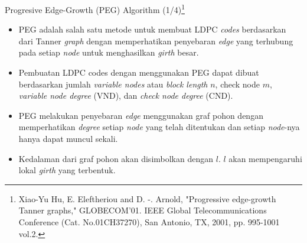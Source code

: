 \documentclass[11pt, aspectratio=169]{beamer}
\begin{document}
\begin{frame}{Progresive Edge-Growth (PEG) Algorithm (1/4)\footnote[1]{\tiny Xiao-Yu Hu, E. Eleftheriou and D. -. Arnold, "Progressive edge-growth Tanner graphs," GLOBECOM'01. IEEE Global Telecommunications Conference (Cat. No.01CH37270), San Antonio, TX, 2001, pp. 995-1001 vol.2.}}
\begin{itemize}
	\item PEG adalah salah satu metode untuk membuat LDPC \textit{codes} berdasarkan dari Tanner \textit{graph} dengan memperhatikan penyebaran \textit{edge} yang terhubung pada setiap \textit{node} untuk menghasilkan \textit{girth} besar.
	\item Pembuatan LDPC codes dengan menggunakan PEG dapat dibuat berdasarkan jumlah \textit{variable nodes} atau \textit{block length} $n$, check node $m$, \textit{variable node degree} (VND), dan \textit{check node degree} (CND).
	\item PEG melakukan penyebaran \textit{edge} menggunakan graf pohon dengan memperhatikan \textit{degree} setiap \textit{node} yang telah ditentukan dan setiap \textit{node}-nya hanya dapat muncul sekali.
	\item Kedalaman dari graf pohon akan disimbolkan dengan $l$. $l$ akan mempengaruhi lokal \textit{girth} yang terbentuk.
\end{itemize}

\end{frame}
\end{document}
